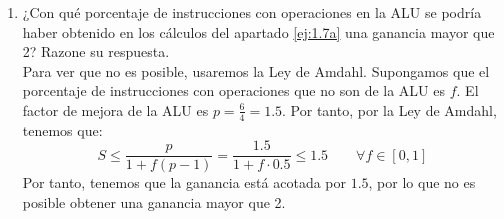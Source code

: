 \begin{ejercicio}
\begin{enumerate}
        \item ¿Con qué porcentaje de instrucciones con operaciones en la ALU se podría haber obtenido en los cálculos del apartado \ref{ej:1.7a} una ganancia mayor que 2?
        Razone su respuesta.\\

        Para ver que no es posible, usaremos la Ley de Amdahl. Supongamos que el porcentaje de instrucciones con operaciones que no son de la ALU es $f$.
        El factor de mejora de la ALU es $p=\frac{6}{4}=1.5$. Por tanto, por la Ley de Amdahl, tenemos que:
        \begin{equation*}
            S \leq \frac{p}{1+f(p-1)} = \frac{1.5}{1+f\cdot 0.5} \leq 1.5 \qquad \forall f\in [0,1]
        \end{equation*}
        Por tanto, tenemos que la ganancia está acotada por $1.5$, por lo que no es posible obtener una ganancia mayor que 2.
    \end{enumerate}
\end{ejercicio}


